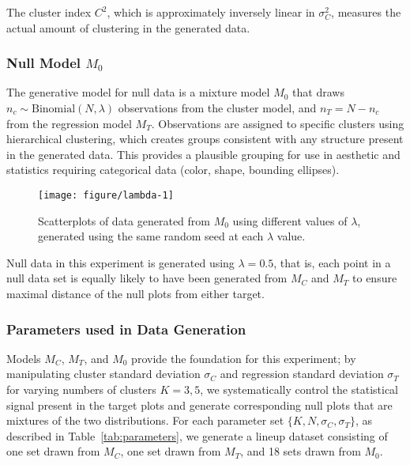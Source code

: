 \documentclass[12pt]{article}\usepackage[]{graphicx}\usepackage[]{color}
\newenvironment{knitrout}{}{} %
\begin{document}
The cluster index $C^2$, which is approximately inversely linear in $\sigma_C^2$, measures the actual amount of clustering in the generated data.



\subsubsection{Null Model \texorpdfstring{$M_0$}{M0}}
The generative model for null data is a mixture model $M_0$ that draws $n_c \sim \text{Binomial}(N, \lambda)$ observations from the cluster model, and $n_T = N - n_c$ from the regression model $M_T$. Observations are assigned to specific clusters using hierarchical clustering, which creates groups consistent with any structure present in the generated data. This provides a plausible grouping for use in aesthetic and statistics requiring categorical data (color, shape, bounding ellipses). 

\begin{figure}[hbt]
\begin{knitrout}
\color{fgcolor}

{\centering \texttt{[image: figure/lambda-1]} 

}



\end{knitrout}
\caption[Mixing parameter for null model $M_0$]{\label{fig:lambda} Scatterplots of data generated from $M_0$ using different values of $\lambda$, generated using the same random seed at each $\lambda$ value.}
\end{figure}

Null data in this experiment is generated using $\lambda = 0.5$, that is, each point in a null data set is equally likely to have been generated from $M_C$ and $M_T$ to ensure maximal distance of the null plots from either target. 

\subsubsection{Parameters used in Data Generation}
Models $M_C$, $M_T$, and $M_0$ provide the foundation for this experiment; by manipulating cluster standard deviation $\sigma_C$ and regression standard deviation $\sigma_T$ for varying numbers of clusters $K=3, 5$, we  systematically control the statistical signal present in the target plots and generate corresponding null plots that are mixtures of the two distributions. For each parameter set $\{K, N, \sigma_C, \sigma_T\}$, as described in Table~\ref{tab:parameters}, we  generate a lineup dataset consisting of one set drawn from $M_C$, one set drawn from $M_T$, and 18 sets drawn from $M_0$. 
\end{document}

